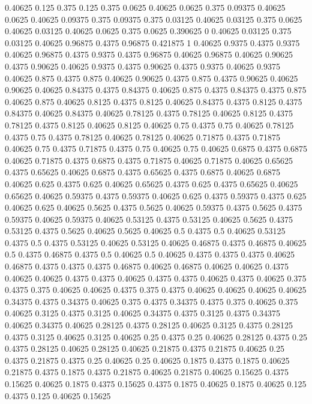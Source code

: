 0.40625 0.125
0.375 0.125
0.375 0.0625
0.40625 0.0625
0.375 0.09375
0.40625 0.0625
0.40625 0.09375
0.375 0.09375
0.375 0.03125
0.40625 0.03125
0.375 0.0625
0.40625 0.03125
0.40625 0.0625
0.375 0.0625
0.390625 0
0.40625 0.03125
0.375 0.03125
0.40625 0.96875
0.4375 0.96875
0.421875 1
0.40625 0.9375
0.4375 0.9375
0.40625 0.96875
0.4375 0.9375
0.4375 0.96875
0.40625 0.96875
0.40625 0.90625
0.4375 0.90625
0.40625 0.9375
0.4375 0.90625
0.4375 0.9375
0.40625 0.9375
0.40625 0.875
0.4375 0.875
0.40625 0.90625
0.4375 0.875
0.4375 0.90625
0.40625 0.90625
0.40625 0.84375
0.4375 0.84375
0.40625 0.875
0.4375 0.84375
0.4375 0.875
0.40625 0.875
0.40625 0.8125
0.4375 0.8125
0.40625 0.84375
0.4375 0.8125
0.4375 0.84375
0.40625 0.84375
0.40625 0.78125
0.4375 0.78125
0.40625 0.8125
0.4375 0.78125
0.4375 0.8125
0.40625 0.8125
0.40625 0.75
0.4375 0.75
0.40625 0.78125
0.4375 0.75
0.4375 0.78125
0.40625 0.78125
0.40625 0.71875
0.4375 0.71875
0.40625 0.75
0.4375 0.71875
0.4375 0.75
0.40625 0.75
0.40625 0.6875
0.4375 0.6875
0.40625 0.71875
0.4375 0.6875
0.4375 0.71875
0.40625 0.71875
0.40625 0.65625
0.4375 0.65625
0.40625 0.6875
0.4375 0.65625
0.4375 0.6875
0.40625 0.6875
0.40625 0.625
0.4375 0.625
0.40625 0.65625
0.4375 0.625
0.4375 0.65625
0.40625 0.65625
0.40625 0.59375
0.4375 0.59375
0.40625 0.625
0.4375 0.59375
0.4375 0.625
0.40625 0.625
0.40625 0.5625
0.4375 0.5625
0.40625 0.59375
0.4375 0.5625
0.4375 0.59375
0.40625 0.59375
0.40625 0.53125
0.4375 0.53125
0.40625 0.5625
0.4375 0.53125
0.4375 0.5625
0.40625 0.5625
0.40625 0.5
0.4375 0.5
0.40625 0.53125
0.4375 0.5
0.4375 0.53125
0.40625 0.53125
0.40625 0.46875
0.4375 0.46875
0.40625 0.5
0.4375 0.46875
0.4375 0.5
0.40625 0.5
0.40625 0.4375
0.4375 0.4375
0.40625 0.46875
0.4375 0.4375
0.4375 0.46875
0.40625 0.46875
0.40625 0.40625
0.4375 0.40625
0.40625 0.4375
0.4375 0.40625
0.4375 0.4375
0.40625 0.4375
0.40625 0.375
0.4375 0.375
0.40625 0.40625
0.4375 0.375
0.4375 0.40625
0.40625 0.40625
0.40625 0.34375
0.4375 0.34375
0.40625 0.375
0.4375 0.34375
0.4375 0.375
0.40625 0.375
0.40625 0.3125
0.4375 0.3125
0.40625 0.34375
0.4375 0.3125
0.4375 0.34375
0.40625 0.34375
0.40625 0.28125
0.4375 0.28125
0.40625 0.3125
0.4375 0.28125
0.4375 0.3125
0.40625 0.3125
0.40625 0.25
0.4375 0.25
0.40625 0.28125
0.4375 0.25
0.4375 0.28125
0.40625 0.28125
0.40625 0.21875
0.4375 0.21875
0.40625 0.25
0.4375 0.21875
0.4375 0.25
0.40625 0.25
0.40625 0.1875
0.4375 0.1875
0.40625 0.21875
0.4375 0.1875
0.4375 0.21875
0.40625 0.21875
0.40625 0.15625
0.4375 0.15625
0.40625 0.1875
0.4375 0.15625
0.4375 0.1875
0.40625 0.1875
0.40625 0.125
0.4375 0.125
0.40625 0.15625
